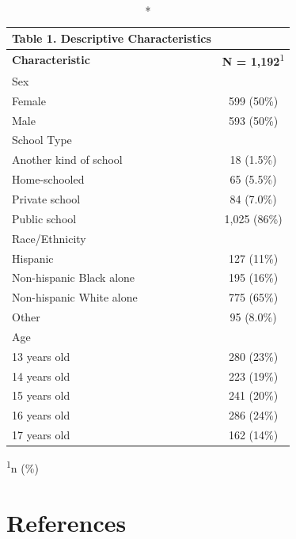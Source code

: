 \documentclass[
]{article}
\begin{document}
\captionsetup[table]{labelformat=empty,skip=1pt}
\begin{longtable}{lc}
\caption*{
{\large Table 1. Descriptive Characteristics}
} \\ 
\toprule
\textbf{Characteristic} & \textbf{N = 1,192}\textsuperscript{1} \\ 
\midrule
Sex &  \\ 
Female & 599 (50\%) \\ 
Male & 593 (50\%) \\ 
School Type &  \\ 
Another kind of school & 18 (1.5\%) \\ 
Home-schooled & 65 (5.5\%) \\ 
Private school & 84 (7.0\%) \\ 
Public school & 1,025 (86\%) \\ 
Race/Ethnicity &  \\ 
Hispanic & 127 (11\%) \\ 
Non-hispanic Black alone & 195 (16\%) \\ 
Non-hispanic White alone & 775 (65\%) \\ 
Other & 95 (8.0\%) \\ 
Age &  \\ 
13 years old & 280 (23\%) \\ 
14 years old & 223 (19\%) \\ 
15 years old & 241 (20\%) \\ 
16 years old & 286 (24\%) \\ 
17 years old & 162 (14\%) \\ 
 \bottomrule
\end{longtable}
\vspace{-5mm}
\begin{minipage}{\linewidth}
\textsuperscript{1}n (\%) \\ 
\end{minipage}

\newpage

\hypertarget{references}{%
\section{References}\label{references}}
\end{document}

